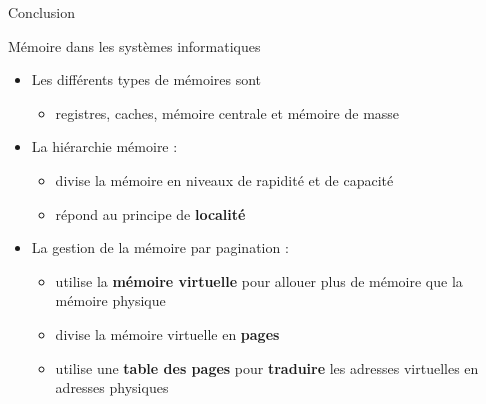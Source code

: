 \documentclass[8pt]{beamer}
\begin{document}
\begin{frame}{Conclusion}
    \begin{block}{Mémoire dans les systèmes informatiques}
        \begin{itemize}
            \item Les différents types de mémoires sont
                  \begin{itemize}
                      \item registres, caches, mémoire centrale et mémoire de
                            masse
                  \end{itemize}
            \item La hiérarchie mémoire :
                  \begin{itemize}
                      \item divise la mémoire en niveaux de rapidité et de
                            capacité
                      \item r\'epond au principe de \textbf{localité}
                  \end{itemize}
            \item La gestion de la mémoire par pagination :
                  \begin{itemize}
                      \item utilise la \textbf{mémoire virtuelle} pour allouer
                            plus de
                            mémoire que la mémoire physique
                      \item divise la mémoire virtuelle en \textbf{pages}
                      \item utilise une \textbf{table des pages} pour
                            \textbf{traduire} les
                            adresses
                            virtuelles en adresses physiques
                  \end{itemize}
        \end{itemize}
    \end{block}


\end{frame}
\end{document}
